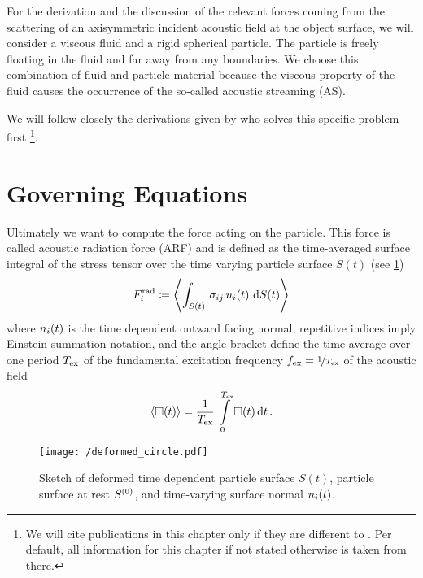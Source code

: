 For the derivation and the discussion of the relevant forces coming from the 
scattering of an axisymmetric incident acoustic field at the object surface, we 
will consider a viscous fluid and a rigid spherical particle. The particle is 
freely floating in the fluid and far away from any boundaries. We choose this 
combination of fluid and particle material because the viscous property of the 
fluid causes the occurrence of the so-called acoustic streaming (AS).

We will follow closely the derivations given by  who 
solves this specific problem first \footnote{We will cite publications in this 
chapter only if they are different to . Per default, 
all information for this chapter if not stated otherwise is taken from there.}.

\section{Governing Equations}

Ultimately we want to compute the force acting on the particle. This force is 
called acoustic radiation force (ARF) and is defined as the time-averaged 
surface integral of the stress tensor over the time varying particle surface 
$S(t)$ (see \cref{fig:TA-deformed_circle})
\begin{equation}
  F^{\mathrm{rad}}_{i} \coloneqq
  \left\langle \int_{S(t)}\,\sigma_{ij}\,n_{i}(t)\,\dd{S(t)} \right\rangle
  \label{eq:TA-def-rad}
\end{equation}
where $n_{i}(t)$ is the time dependent outward facing normal, repetitive 
indices imply Einstein summation notation, and the angle bracket define the 
time-average over one period $T_{\mathrm{ex}}$ of the fundamental excitation 
frequency $f_{\mathrm{ex}}=\nicefrac{1}{T_{\mathrm{ex}}}$ of the acoustic field
\begin{equation}
  \left\langle \Box(t) \right\rangle = 
  \frac{1}{T_{\mathrm{ex}}}\,\int\limits_{0}^{T_{\mathrm{ex}}}\Box(t)\dd{t}.
  \label{eq:TA-time-average}
\end{equation}

\begin{figure}[tbp]
  \centering
  \texttt{[image: /deformed\_circle.pdf]}
  \caption{Sketch of deformed time dependent particle surface $S(t)$, particle 
  surface at rest $S^{(0)}$, and time-varying surface normal $n_{i}(t)$.}
  \label{fig:TA-deformed_circle}
\end{figure}

